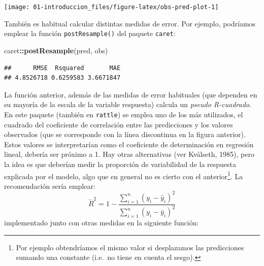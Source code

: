 \documentclass[
]{book}
\newenvironment{Shaded}{\begin{snugshade}}{\end{snugshade}}
\newcommand{\DataTypeTok}[1]{\textcolor[rgb]{0.13,0.29,0.53}{#1}}
\newcommand{\KeywordTok}[1]{\textcolor[rgb]{0.13,0.29,0.53}{\textbf{#1}}}
\newcommand{\NormalTok}[1]{#1}
\newcommand{\OperatorTok}[1]{\textcolor[rgb]{0.81,0.36,0.00}{\textbf{#1}}}
\newcommand{\StringTok}[1]{\textcolor[rgb]{0.31,0.60,0.02}{#1}}
\theoremstyle{break}
\theoremstyle{definition}
\theoremstyle{definition}
\theoremstyle{definition}
\theoremstyle{remark}
\begin{document}
\begin{Shaded}
\end{Shaded}

\begin{center}\texttt{[image: 01-introduccion\_files/figure-latex/obs-pred-plot-1]} \end{center}

También es habitual calcular distintas medidas de error.
Por ejemplo, podríamos emplear la función \texttt{postResample()} del paquete \texttt{caret}:

\begin{Shaded}
\begin{Highlighting}[]
\NormalTok{caret}\OperatorTok{::}\KeywordTok{postResample}\NormalTok{(pred, obs)}
\end{Highlighting}
\end{Shaded}

\begin{verbatim}
##      RMSE  Rsquared       MAE 
## 4.8526718 0.6259583 3.6671847
\end{verbatim}

La función anterior, además de las medidas de error habituales (que dependen en su mayoría de la escala de la variable respuesta) calcula un \emph{pseudo R-cuadrado}.
En este paquete (también en \texttt{rattle}) se emplea uno de los más utilizados, el cuadrado del coeficiente de correlación entre las predicciones y los valores observados (que se corresponde con la línea discontinua en la figura anterior).
Estos valores se interpretarían como el coeficiente de determinación en regresión lineal, debería ser próximo a 1.
Hay otras alternativas (ver Kvålseth, 1985), pero la idea es que deberían medir la proporción de variabilidad de la respuesta explicada por el modelo, algo que en general no es cierto con el anterior\footnote{Por ejemplo obtendríamos el mismo valor si desplazamos las predicciones sumando una constante (i.e.~no tiene en cuenta el sesgo).}.
La recomendación sería emplear:
\[\tilde R^2 = 1 - \frac{\sum_{i=1}^n(y_i - \hat y_i)^2}{\sum_{i=1}^n(y_i - \bar y_i)^2}\]
implementado junto con otras medidas en la siguiente función:
\end{document}
